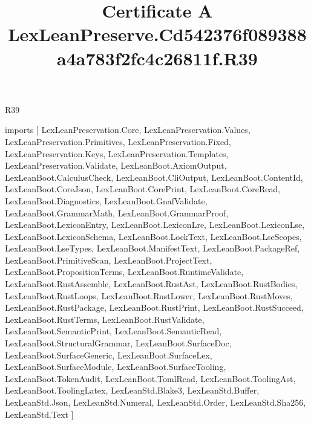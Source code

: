 \begin{lexlean}{R39}
\title{Certificate A LexLeanPreserve.Cd542376f089388a4a783f2fc4c26811f.R39}
\begin{coremodule}
imports [
  LexLeanPreservation.Core,
  LexLeanPreservation.Values,
  LexLeanPreservation.Primitives,
  LexLeanPreservation.Fixed,
  LexLeanPreservation.Keys,
  LexLeanPreservation.Templates,
  LexLeanPreservation.Validate,
  LexLeanBoot.AxiomOutput,
  LexLeanBoot.CalculusCheck,
  LexLeanBoot.CliOutput,
  LexLeanBoot.ContentId,
  LexLeanBoot.CoreJson,
  LexLeanBoot.CorePrint,
  LexLeanBoot.CoreRead,
  LexLeanBoot.Diagnostics,
  LexLeanBoot.GnafValidate,
  LexLeanBoot.GrammarMath,
  LexLeanBoot.GrammarProof,
  LexLeanBoot.LexiconEntry,
  LexLeanBoot.LexiconLre,
  LexLeanBoot.LexiconLse,
  LexLeanBoot.LexiconSchema,
  LexLeanBoot.LockText,
  LexLeanBoot.LseScopes,
  LexLeanBoot.LseTypes,
  LexLeanBoot.ManifestText,
  LexLeanBoot.PackageRef,
  LexLeanBoot.PrimitiveScan,
  LexLeanBoot.ProjectText,
  LexLeanBoot.PropositionTerms,
  LexLeanBoot.RuntimeValidate,
  LexLeanBoot.RustAssemble,
  LexLeanBoot.RustAst,
  LexLeanBoot.RustBodies,
  LexLeanBoot.RustLoops,
  LexLeanBoot.RustLower,
  LexLeanBoot.RustMoves,
  LexLeanBoot.RustPackage,
  LexLeanBoot.RustPrint,
  LexLeanBoot.RustSucceed,
  LexLeanBoot.RustTerms,
  LexLeanBoot.RustValidate,
  LexLeanBoot.SemanticPrint,
  LexLeanBoot.SemanticRead,
  LexLeanBoot.StructuralGrammar,
  LexLeanBoot.SurfaceDoc,
  LexLeanBoot.SurfaceGeneric,
  LexLeanBoot.SurfaceLex,
  LexLeanBoot.SurfaceModule,
  LexLeanBoot.SurfaceTooling,
  LexLeanBoot.TokenAudit,
  LexLeanBoot.TomlRead,
  LexLeanBoot.ToolingAst,
  LexLeanBoot.ToolingLatex,
  LexLeanStd.Blake3,
  LexLeanStd.Buffer,
  LexLeanStd.Json,
  LexLeanStd.Numeral,
  LexLeanStd.Order,
  LexLeanStd.Sha256,
  LexLeanStd.Text
]


\end{coremodule}
\end{lexlean}
